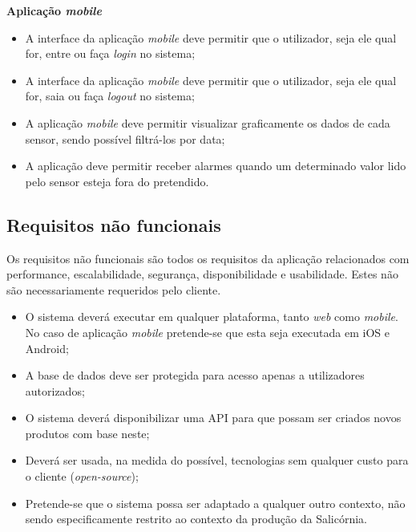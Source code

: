\textbf{Aplicação \textit{mobile}}



\begin{itemize}
	\item A interface da aplicação \textit{mobile} deve permitir que o utilizador, seja ele qual for, entre ou faça \textit{login} no sistema; 
	
	\item A interface da aplicação \textit{mobile} deve permitir que o utilizador, seja ele qual for, saia ou faça \textit{logout} no sistema;
	
	
	\item A aplicação \textit{mobile} deve permitir visualizar graficamente os dados de cada sensor, sendo possível filtrá-los por data;
	
	\item  A aplicação deve permitir receber alarmes quando um determinado valor lido pelo sensor esteja fora do pretendido.
	
	
\end{itemize}



\subsection{Requisitos não funcionais}


Os requisitos não funcionais são todos os requisitos da aplicação relacionados com performance, escalabilidade, segurança, disponibilidade e usabilidade. Estes não são necessariamente requeridos pelo cliente. 


\begin{itemize}
	\item O sistema deverá executar em qualquer plataforma, tanto \textit{web} como \textit{mobile}. No caso de aplicação \textit{mobile} pretende-se que esta seja executada em iOS e Android;  
	
	
	\item A base de dados deve ser protegida para acesso apenas a utilizadores autorizados; 
	
	
	\item O sistema deverá disponibilizar uma \ac{API} para que possam ser criados novos produtos com base neste;  
	
	\item Deverá ser usada, na medida do possível, tecnologias sem qualquer custo para o cliente (\textit{open-source}); 
	
	\item Pretende-se que o sistema possa ser adaptado a qualquer outro contexto, não sendo especificamente restrito ao contexto da produção da Salicórnia.  
	
\end{itemize}




